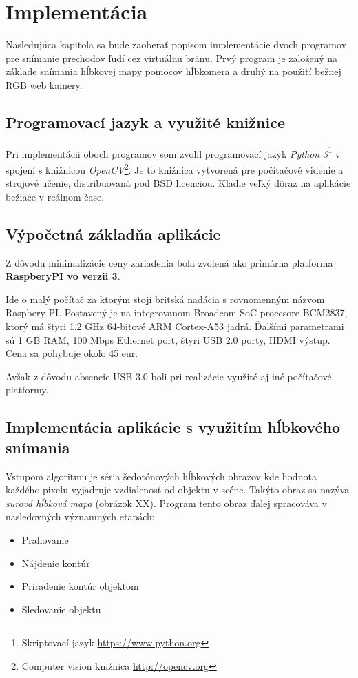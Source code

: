 \chapter{Implementácia}

Nasledujúca kapitola sa bude zaoberať popisom implementácie dvoch programov pre snímanie prechodov ľudí cez virtuálnu bránu. Prvý program je založený na základe snímania hĺbkovej mapy pomocov hĺbkomera a druhý  na použití bežnej RGB web kamery.

\section{Programovací jazyk a využité knižnice}
Pri implementácii oboch programov som zvolil programovací jazyk \textit{Python 3}\footnote{Skriptovací jazyk \url{https://www.python.org}} v spojení s knižnicou \textit{OpenCV}\footnote{Computer vision knižnica  \url{http://opencv.org}}. Je to knižnica vytvorená pre počítačové videnie a strojové učenie, distribuovaná pod BSD licenciou. Kladie veľký dôraz na aplikácie bežiace v reálnom čase. 

\section{Výpočetná základňa aplikácie}
Z dôvodu minimalizácie ceny zariadenia bola zvolená ako primárna platforma \textbf{RaspberyPI vo verzii 3}. 

Ide o malý počítač za ktorým stojí britská nadácia s rovnomenným názvom Raspbery PI. Postavený je na  integrovanom Broadcom SoC procesore BCM2837, ktorý má štyri 1.2 GHz 64-bitové ARM Cortex-A53 jadrá. Ďalšími parametrami sú 1 GB RAM, 100 Mbps Ethernet port, štyri USB 2.0 porty, HDMI výstup. Cena sa pohybuje okolo 45 eur. 

Avšak z dôvodu absencie USB 3.0 boli pri realizácie využité aj iné počítačové platformy.

\section{Implementácia aplikácie s využitím hĺbkového snímania}
Vstupom algoritmu je séria šedotónových hĺbkových obrazov kde hodnota každého pixelu vyjadruje vzdialenosť od objektu v scéne. Takýto obraz sa nazýva \textit{surová hĺbková mapa} (obrázok XX). Program tento obraz ďalej spracováva v nasledovných významných etapách: 

\begin{itemize}
\item Prahovanie
\item Nájdenie kontúr
\item Priradenie kontúr objektom
\item Sledovanie objektu 
\end{itemize}




